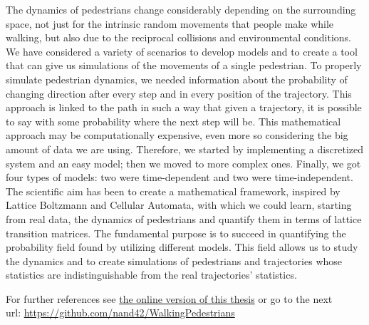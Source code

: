 \documentclass{standalone}
\begin{document}
The dynamics of pedestrians change considerably depending on the surrounding space, not just for the intrinsic random movements that people make while walking, but also due to the reciprocal collisions and environmental conditions. 
We have considered a variety of scenarios to develop models and to create a tool that can give us simulations of the movements of a single pedestrian. 
To properly simulate pedestrian dynamics, we needed information about the probability of changing direction after every step and in every position of the trajectory. 
This approach is linked to the path in such a way that given a trajectory, it is possible to say with some probability where the next step will be. 
This mathematical approach may be computationally expensive, even more so considering the big amount of data we are using. 
Therefore, we started by implementing a discretized system and an easy model; then we moved to more complex ones. 
Finally, we got four types of models: two were time-dependent and two were time-independent. 
The scientific aim has been to create a mathematical framework, inspired by Lattice Boltzmann and Cellular Automata, with which we could learn, starting from real data, the dynamics of pedestrians and quantify them in terms of lattice transition matrices. 
The fundamental purpose is to succeed in quantifying the probability field found by utilizing different models. 
This field allows us to study the dynamics and to create simulations of pedestrians and trajectories whose statistics are indistinguishable from the real trajectories’ statistics.

\vspace*{13.5cm}

For further references see \href{https://github.com/nand42/WalkingPedestrians}{the online version of this thesis} 
or go to the next 
\\ \hspace*{4mm} url: \url{https://github.com/nand42/WalkingPedestrians}
\end{document}

